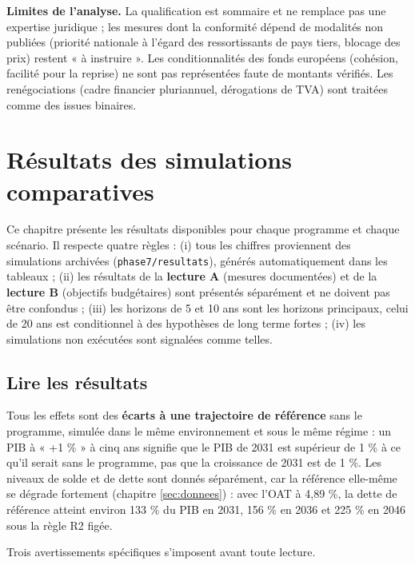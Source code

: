 \documentclass[
  11pt,
  11pt,
  a4paper,
  openany]{book}
\begin{document}
\textbf{Limites de l'analyse.} La qualification est sommaire et ne
remplace pas une expertise juridique ; les mesures dont la conformité
dépend de modalités non publiées (priorité nationale à l'égard des
ressortissants de pays tiers, blocage des prix) restent « à instruire ».
Les conditionnalités des fonds européens (cohésion, facilité pour la
reprise) ne sont pas représentées faute de montants vérifiés. Les
renégociations (cadre financier pluriannuel, dérogations de TVA) sont
traitées comme des issues binaires.

\hypertarget{sec:resultats}{%
\chapter{Résultats des simulations comparatives}\label{sec:resultats}}

Ce chapitre présente les résultats disponibles pour chaque programme et
chaque scénario. Il respecte quatre règles : (i) tous les chiffres
proviennent des simulations archivées (\texttt{phase7/resultats}),
générés automatiquement dans les tableaux ; (ii) les résultats de la
\textbf{lecture A} (mesures documentées) et de la \textbf{lecture B}
(objectifs budgétaires) sont présentés séparément et ne doivent pas être
confondus ; (iii) les horizons de 5 et 10 ans sont les horizons
principaux, celui de 20 ans est conditionnel à des hypothèses de long
terme fortes ; (iv) les simulations non exécutées sont signalées comme
telles.

\hypertarget{sec:lire}{%
\section{Lire les résultats}\label{sec:lire}}

Tous les effets sont des \textbf{écarts à une trajectoire de référence}
sans le programme, simulée dans le même environnement et sous le même
régime : un PIB à « +1 \% » à cinq ans signifie que le PIB de 2031 est
supérieur de 1 \% à ce qu'il serait sans le programme, pas que la
croissance de 2031 est de 1 \%. Les niveaux de solde et de dette sont
donnés séparément, car la référence elle-même se dégrade fortement
(chapitre \ref{sec:donnees}) : avec l'OAT à 4,89 \%, la dette de
référence atteint environ 133 \% du PIB en 2031, 156 \% en 2036 et 225
\% en 2046 sous la règle R2 figée.

Trois avertissements spécifiques s'imposent avant toute lecture.
\end{document}
